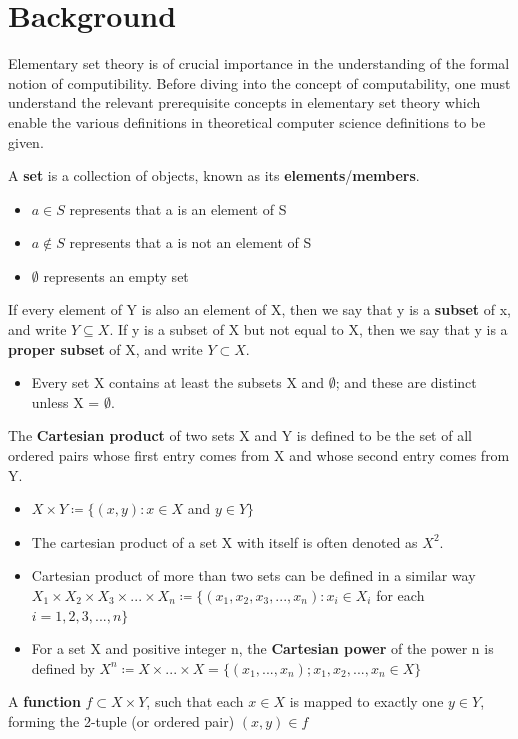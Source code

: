 \documentclass{article}
\begin{document}
\section{Background}
Elementary set theory is of crucial importance in the understanding of the formal notion of computibility. Before diving into the concept of computability, one must understand the relevant prerequisite concepts in elementary set theory which enable the various definitions in theoretical computer science definitions to be given.
\begin{defin}
A \textbf{set} is a collection of objects, known as its \textbf{elements}/\textbf{members}.
\begin{itemize}
\item $a\in S$ represents that a is an element of S
\item $a \notin S$ represents that a is not an element of S
\item $\emptyset$ represents an empty set
\end{itemize}
\end{defin}
\begin{defin}
If every element of Y is also an element of X, then we say that y is a \textbf{subset} of x, and write $Y\subseteq X$.
If y is a subset of X but not equal to X, then we say that y is a \textbf{proper subset} of X, and write $Y\subset X$.
\begin{itemize}
\item Every set X contains at least the subsets X and $\emptyset$; and these are distinct unless X = $\emptyset$.
\end{itemize}
\end{defin}
\begin{defin}
The \textbf{Cartesian product} of two sets X and Y is defined to be the set of all ordered pairs whose first entry comes from X and whose second entry comes from Y.
\begin{itemize}
\item $X \times Y \coloneq \{ (x, y): x \in X$ and $y \in Y \}$
\item The cartesian product of a set X with itself is often denoted as $X^{2}$.
\item Cartesian product of more than two sets can be defined in a similar way
$X_{1}\times X_{2}\times X_{3} \times {...} \times X_{n} \coloneq \{( x_{1},x_{2},x_{3},{...},x_{n}):x_{i}\in X_{i}$ for each $i = 1,2,3,{...},n\}$
\item For a set X and positive integer n, the \textbf{Cartesian power} of the power n is defined by
$X^{n} \coloneq X \times {...} \times X = \{(x_{1},{...},x_n) ; x_{1},x_{2},{...},x_{n}\in X\}$
\end{itemize}
\end{defin}
\begin{defin}
A \textbf{function} $f \subset X \times Y$, such that each $x \in X$ is mapped to exactly one $y \in Y$, forming the 2-tuple (or ordered pair) $(x, y) \in f$
\end{defin}
\end{document}
